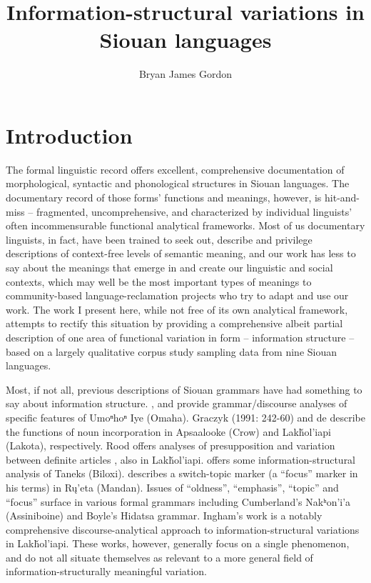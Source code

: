 \documentclass[output=paper]{LSP/langsci}
\author{Bryan James Gordon}
\title{Information-structural variations in Siouan languages}
\begin{document}
\section{Introduction}

	The formal linguistic record offers excellent, comprehensive documentation of morphological, syntactic and phonological structures in Siouan languages. The documentary record of those forms’ functions and meanings, however, is hit-and-miss -- fragmented, uncomprehensive, and characterized by individual linguists’ often incommensurable functional analytical frameworks. Most of us documentary linguists, in fact, have been trained to seek out, describe and privilege descriptions of context-free levels of semantic meaning, and our work has less to say about the meanings that emerge in and create our linguistic and social contexts, which may well be the most important types of meanings to community-based language-reclamation projects who try to adapt and use our work. The work I present here, while not free of its own analytical framework, attempts to rectify this situation by providing a comprehensive albeit partial description of one area of functional variation in form -- information structure -- based on a largely qualitative corpus study sampling data from nine Siouan languages.
	
	Most, if not all, previous descriptions of Siouan grammars have had something to say about information structure. \citet{Rudin1998}, \citet{Koontz2003} and \citet{Eschenberg2005} provide grammar/discourse analyses of specific features of Umoⁿhoⁿ Iye (Omaha). Graczyk (1991: 242-60) and de \citet{Reuse1994} describe the functions of noun incorporation in Apsaalooke (Crow) and Lakȟol’iapi (Lakota), respectively. Rood offers analyses of presupposition  and variation between definite articles , also in Lakȟol’iapi. \citet{Kaufman2008} offers some information-structural analysis of Taneks (Biloxi). \citet{Wolvengrey1990} describes a switch-topic marker (a “focus” marker in his terms) in Rų’eta (Mandan). Issues of “oldness”, “emphasis”, “topic” and “focus” surface in various formal grammars including Cumberland’s  Nakʰon’i’a (Assiniboine) and Boyle’s  Hidatsa grammar. Ingham’s work  is a notably comprehensive discourse-analytical approach to in\-for\-ma\-tion-structural variations in La\-kȟol\-’ia\-pi. These works, however, generally focus on a single phenomenon, and do not all situate themselves as relevant to a more general field of information-structurally meaningful variation. 
	
\end{document}
